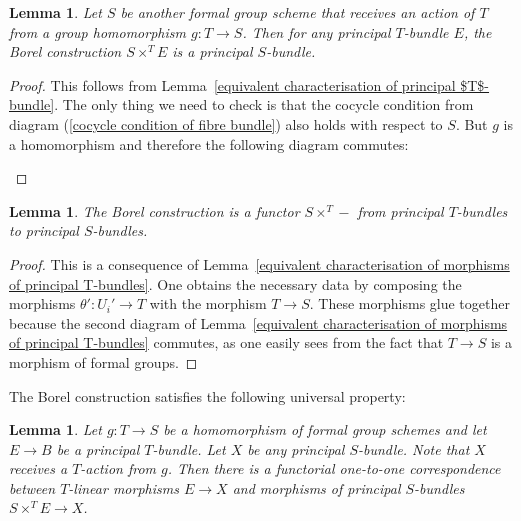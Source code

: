 \documentclass[10pt,oneside]{amsart}
\newtheorem{lemma}[theorem]{Lemma}
\theoremstyle{definition}
\theoremstyle{remark}
\begin{document}
	\begin{lemma}
		Let $S$ be another formal group scheme that receives an action of $T$ from a group homomorphism $g:T\rightarrow S$. Then for any principal $T$-bundle $E$, the Borel construction $S\times^T E$ is a principal $S$-bundle.
	\end{lemma}
	\begin{proof}
		This follows from Lemma~\ref{equivalent characterisation of principal $T$-bundle}. The only thing we need to check is that the cocycle condition from diagram (\ref{cocycle condition of fibre bundle}) also holds with respect to $S$. But $g$ is a homomorphism and therefore the following diagram commutes:
		\begin{center}
		\end{center}
		
		
	\end{proof}
	
	
	\begin{lemma}\label{change of fibre is functorial}
		The Borel construction is a functor $S\times^T -$ from principal $T$-bundles to principal $S$-bundles.
	\end{lemma}
	\begin{proof}
		This is a consequence of Lemma~\ref{equivalent characterisation of morphisms of principal T-bundles}. One obtains the necessary data by composing the morphisms $\theta':U_i'\rightarrow T$ with the morphism $T\rightarrow S$. These morphisms glue together because the second diagram of Lemma~\ref{equivalent characterisation of morphisms of principal T-bundles} commutes, as one easily sees from the fact that $T\rightarrow S$ is a morphism of formal groups. 
	\end{proof}
	
	The Borel construction satisfies the following universal property:
	\begin{lemma}\label{universal property of associated fibre construction for principal bundles}
		Let $g:T\rightarrow S$ be a homomorphism of formal group schemes and let $E\rightarrow B$ be a principal $T$-bundle. Let $X$ be any principal $S$-bundle. Note that $X$ receives a $T$-action from $g$. Then there is a functorial one-to-one correspondence between $T$-linear morphisms $E\rightarrow X$ and morphisms of principal $S$-bundles $S\times^T E\rightarrow X$.
	\end{lemma}
	
\end{document}
